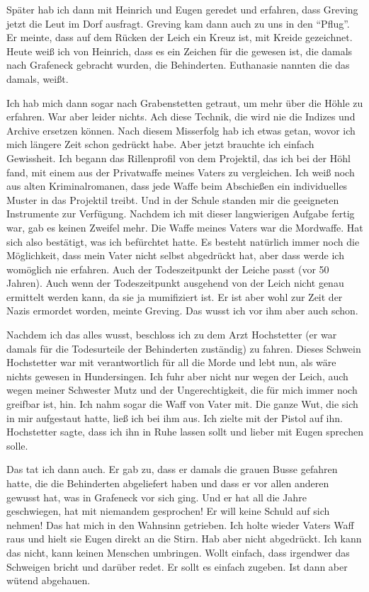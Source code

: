 Später hab ich dann mit Heinrich und Eugen geredet und erfahren, dass Greving jetzt die Leut im Dorf
ausfragt. Greving kam dann auch zu uns in den \enquote{Pflug}. Er meinte, dass auf dem Rücken der
Leich ein
Kreuz ist, mit Kreide gezeichnet. Heute weiß ich von Heinrich, dass es ein Zeichen für die gewesen
ist, die damals nach Grafeneck gebracht wurden, die Behinderten. Euthanasie nannten die das damals,
weißt.

Ich hab mich dann sogar nach Grabenstetten getraut, um mehr über die Höhle zu erfahren. War aber
leider nichts. Ach diese Technik, die wird nie die Indizes und Archive ersetzen können. Nach diesem
Misserfolg hab ich etwas getan, wovor ich mich längere Zeit schon gedrückt habe. Aber jetzt brauchte
ich einfach Gewissheit. Ich begann das Rillenprofil von dem Projektil, das ich bei der Höhl fand,
mit einem aus der Privatwaffe meines Vaters zu vergleichen. Ich weiß noch aus alten
Kriminalromanen, dass jede Waffe beim Abschießen ein individuelles Muster in das Projektil treibt.
Und in der Schule standen mir die geeigneten Instrumente zur Verfügung. Nachdem ich mit dieser
langwierigen Aufgabe fertig war, gab es keinen Zweifel mehr. Die Waffe meines Vaters war die
Mordwaffe. Hat sich also bestätigt, was ich befürchtet hatte. Es besteht natürlich immer noch die
Möglichkeit, dass mein Vater nicht selbst abgedrückt hat, aber dass werde ich womöglich nie
erfahren. Auch der Todeszeitpunkt der Leiche passt (vor 50 Jahren). Auch wenn der Todeszeitpunkt
ausgehend von der Leich nicht genau ermittelt werden kann, da sie ja mumifiziert ist. Er ist aber
wohl zur Zeit der Nazis ermordet worden, meinte Greving. Das wusst ich vor ihm aber auch schon.

Nachdem ich das alles wusst, beschloss ich zu dem Arzt Hochstetter (er war damals für die
Todesurteile der Behinderten zuständig) zu fahren. Dieses Schwein Hochstetter war mit verantwortlich
für all die Morde und lebt nun, als wäre nichts gewesen in Hundersingen. Ich fuhr aber nicht nur
wegen der Leich, auch wegen meiner Schwester Mutz und der Ungerechtigkeit, die für mich immer noch
greifbar ist, hin. Ich nahm sogar die Waff von Vater mit. Die ganze Wut, die sich in mir aufgestaut
hatte, ließ ich bei ihm aus. Ich zielte mit der Pistol auf ihn. Hochstetter sagte, dass ich ihn in
Ruhe lassen sollt und lieber mit Eugen sprechen solle.

Das tat ich dann auch. Er gab zu, dass er damals die grauen Busse gefahren hatte, die die
Behinderten
abgeliefert haben und dass er vor allen anderen gewusst hat, was in Grafeneck vor sich ging. Und er
hat all die Jahre geschwiegen, hat mit niemandem gesprochen! Er will keine Schuld auf sich
nehmen! Das hat mich in den Wahnsinn getrieben. Ich holte wieder Vaters Waff raus und hielt sie
Eugen direkt an die Stirn. Hab aber nicht abgedrückt. Ich kann das nicht, kann keinen Menschen
umbringen. Wollt einfach, dass irgendwer das Schweigen bricht und darüber redet. Er sollt es einfach
zugeben. Ist dann aber wütend abgehauen.

